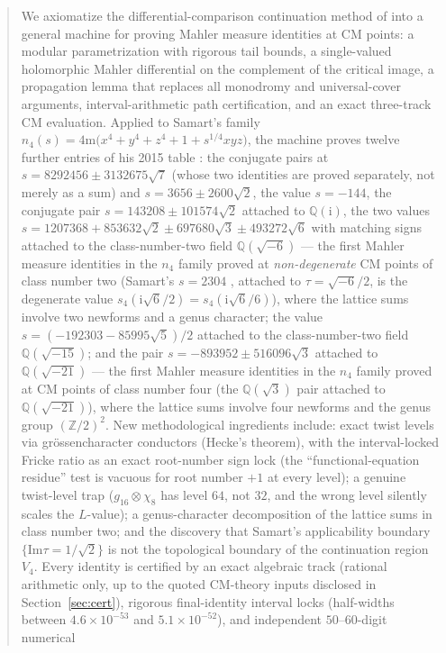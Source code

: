 \documentclass[11pt]{article}
\newcommand{\m}{\mathrm{m}}                 %
\newcommand{\Qq}{\mathbb{Q}}
\newcommand{\Zz}{\mathbb{Z}}
\newcommand{\ii}{\mathrm{i}}
\newcommand{\ImT}{\mathrm{Im}}
\theoremstyle{definition}
\theoremstyle{remark}
\begin{document}
\begin{abstract}
We axiomatize the differential-comparison continuation method of
\cite{Zf} into a general machine for proving Mahler measure identities
at CM points: a modular parametrization with rigorous tail bounds, a
single-valued holomorphic Mahler differential on the complement of the
critical image, a propagation lemma that replaces all monodromy and
universal-cover arguments, interval-arithmetic path certification, and
an exact three-track CM evaluation. Applied to Samart's family
$n_4(s)=4\m\bigl(x^4+y^4+z^4+1+s^{1/4}xyz\bigr)$, the machine proves
twelve further entries of his 2015 table \cite[Table~6]{Sa15}: the
conjugate pairs at $s=8292456\pm3132675\sqrt7$ (whose two identities
are proved separately, not merely as a sum) and
$s=3656\pm2600\sqrt2$, the value $s=-144$,
the conjugate pair $s=143208\pm101574\sqrt2$ attached to
$\Qq(\ii)$, the two values
$s=1207368+853632\sqrt2\pm697680\sqrt3\pm493272\sqrt6$ with matching
signs attached to the
class-number-two field $\Qq(\sqrt{-6})$ --- the first Mahler measure
identities in the $n_4$ family proved at \emph{non-degenerate} CM
points of class number two (Samart's $s=2304$ \cite{Sa13}, attached
to $\tau=\sqrt{-6}/2$, is the degenerate value
$s_4(\ii\sqrt6/2)=s_4(\ii\sqrt6/6)$), where the lattice
sums involve two newforms and a genus character; the value
$s=(-192303-85995\sqrt5)/2$ attached to the class-number-two field
$\Qq(\sqrt{-15})$; and the pair $s=-893952\pm516096\sqrt3$ attached
to $\Qq(\sqrt{-21})$ --- the first Mahler measure identities in the
$n_4$ family proved
at CM points of class number four (the $\Qq(\sqrt3)$ pair attached
to $\Qq(\sqrt{-21})$), where the lattice sums involve four newforms
and the genus group $(\Zz/2)^2$. New methodological
ingredients include: exact twist levels via grössencharacter
conductors (Hecke's theorem), with the interval-locked Fricke ratio
as an exact root-number sign lock (the ``functional-equation residue''
test is vacuous for root number $+1$ at every level); a genuine
twist-level trap ($g_{16}\otimes\chi_8$ has level $64$, not $32$, and
the wrong level silently scales the $L$-value); a genus-character
decomposition of the lattice sums in class number two; and the
discovery that Samart's applicability boundary $\{\ImT\tau=1/\sqrt2\}$
is not the topological boundary of the continuation region $V_4$.
Every identity is certified by an exact algebraic track (rational
arithmetic only, up to the quoted CM-theory inputs disclosed in
Section~\ref{sec:cert}), rigorous final-identity interval locks
(half-widths between
$4.6\times10^{-53}$ and $5.1\times10^{-52}$), and independent $50$--$60$-digit numerical

\end{abstract}
\end{document}
